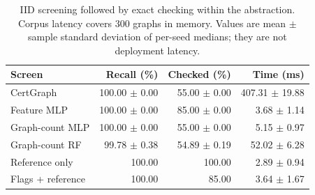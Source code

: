 \begin{table}[t]
\centering
\caption{IID screening followed by exact checking within the abstraction. Corpus latency covers 300 graphs in memory. Values are mean $\pm$ sample standard deviation of per-seed medians; they are not deployment latency.}
\label{tab:cascade}
\footnotesize
\begin{tabular}{lrrr}
\toprule
Screen & Recall (\%) & Checked (\%) & Time (ms) \\
\midrule
CertGraph & 100.00 $\pm$ 0.00 & 55.00 $\pm$ 0.00 & 407.31 $\pm$ 19.88 \\
Feature MLP & 100.00 $\pm$ 0.00 & 85.00 $\pm$ 0.00 & 3.68 $\pm$ 1.14 \\
Graph-count MLP & 100.00 $\pm$ 0.00 & 55.00 $\pm$ 0.00 & 5.15 $\pm$ 0.97 \\
Graph-count RF & 99.78 $\pm$ 0.38 & 54.89 $\pm$ 0.19 & 52.02 $\pm$ 6.28 \\
Reference only & 100.00 & 100.00 & 2.89 $\pm$ 0.94 \\
Flags + reference & 100.00 & 85.00 & 3.64 $\pm$ 1.67 \\
\bottomrule
\end{tabular}
\end{table}
